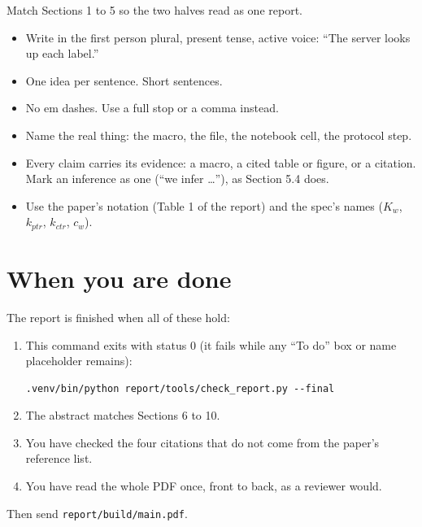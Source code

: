 \documentclass[11pt,a4paper]{article}
\newcommand{\file}[1]{\texttt{#1}}
\begin{document}
Match Sections 1 to 5 so the two halves read as one report.
\begin{itemize}
  \item Write in the first person plural, present tense, active voice: ``The server looks up each label.''
  \item One idea per sentence. Short sentences.
  \item No em dashes. Use a full stop or a comma instead.
  \item Name the real thing: the macro, the file, the notebook cell, the protocol step.
  \item Every claim carries its evidence: a macro, a cited table or figure, or a citation. Mark an inference as
        one (``we infer \dots''), as Section 5.4 does.
  \item Use the paper's notation (Table 1 of the report) and the spec's names ($K_w$, $k_{ptr}$, $k_{ctr}$, $c_w$).
\end{itemize}

\section{When you are done}

The report is finished when all of these hold:
\begin{enumerate}
  \item This command exits with status 0 (it fails while any ``To do'' box or name placeholder remains):
\begin{lstlisting}
.venv/bin/python report/tools/check_report.py --final
\end{lstlisting}
  \item The abstract matches Sections 6 to 10.
  \item You have checked the four citations that do not come from the paper's reference list.
  \item You have read the whole PDF once, front to back, as a reviewer would.
\end{enumerate}
Then send \file{report/build/main.pdf}.
\end{document}
